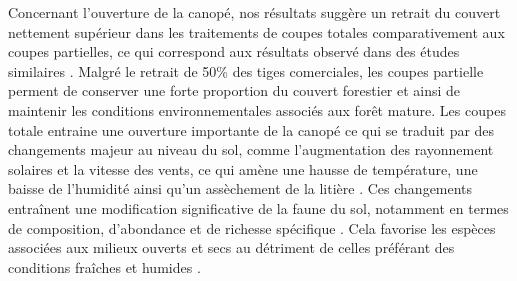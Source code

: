 


Concernant l'ouverture de la canopé, nos résultats suggère un retrait du couvert nettement supérieur dans les traitements de coupes totales comparativement aux coupes partielles, ce qui correspond aux résultats observé dans des études similaires \citep{Nolet2018Comparingeffects,Mazerolle2021Woodlandsalamander}. 
Malgré le retrait de 50\% des tiges comerciales, les coupes partielle perment de conserver une forte proportion du couvert forestier et ainsi de maintenir les conditions environnementales associés aux forêt mature. 
Les coupes totale entraine une ouverture importante de la canopé ce qui se traduit par des changements majeur au niveau du sol, comme l'augmentation des rayonnement solaires et la vitesse des vents, ce qui amène une hausse de température, une baisse de l'humidité ainsi qu'un assèchement de la litière \citep{Keenan1993ecologicaleffects,Chen1999MicroclimateForest,Lindo2003Microbialbiomass,Brooks2008Forestfloor}. 
Ces changements entraînent une modification significative de la faune du sol, notamment en termes de composition, d'abondance et de richesse spécifique \citep{Staab2023Insectdecline}. 
Cela favorise les espèces associées aux milieux ouverts et secs au détriment de celles préférant des conditions fraîches et humides \citep{Niemela2007effectsforestry,Ochs2022Responseterrestrial,Staab2023Insectdecline}.




